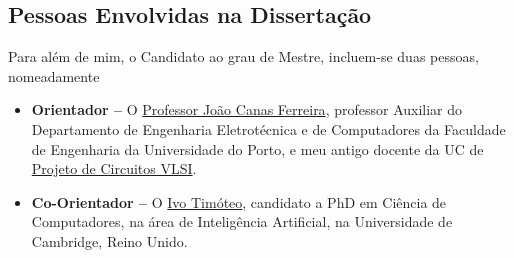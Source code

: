 \documentclass[a4paper, onecolumn, 10pt]{article}
\begin{document}
	\subsection{Pessoas Envolvidas na Dissertação}
	Para além de mim, o Candidato ao grau de Mestre, incluem-se duas pessoas, nomeadamente

	\begin{itemize}
		\item
			\textbf{Orientador --} O \href{https://sigarra.up.pt/feup/pt/func_geral.formview?p_codigo=210963}{Professor João Canas Ferreira}, professor Auxiliar do Departamento de Engenharia Eletrotécnica e de Computadores da Faculdade de Engenharia da Universidade do Porto, e meu antigo docente da UC de \href{https://sigarra.up.pt/feup/pt/UCURR_GERAL.FICHA_UC_VIEW?pv_ocorrencia_id=352359}{Projeto de Circuitos VLSI}.
		\item
			\textbf{Co-Orientador --} O \href{http://www.cl.cam.ac.uk/~ijpdmt2/}{Ivo Timóteo}, candidato a PhD em Ciência de Computadores, na área de Inteligência Artificial, na Universidade de Cambridge, Reino Unido.
	
	\end{itemize}	
\end{document}
